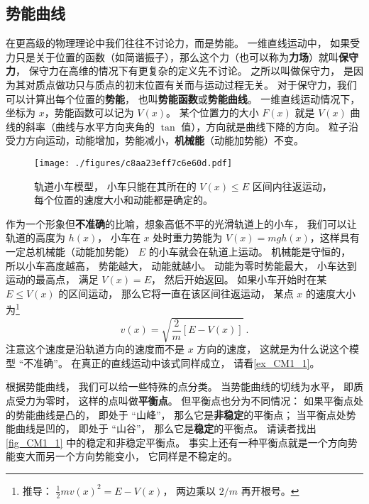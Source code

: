 \subsection{势能曲线}
在更高级的物理理论中我们往往不讨论力，而是势能。 一维直线运动中， 如果受力只是关于位置的函数（如简谐振子），那么这个力（也可以称为\textbf{力场}）就叫\textbf{保守力}， 保守力在高维的情况下有更复杂的定义先不讨论。 之所以叫做保守力， 是因为其对质点做功只与质点的初末位置有关而与运动过程无关。 对于保守力，我们可以计算出每个位置的\textbf{势能}， 也叫\textbf{势能函数}或\textbf{势能曲线}。 一维直线运动情况下，坐标为 $x$，势能函数可以记为 $V(x)$。 某个位置力的大小 $F(x)$ 就是 $V(x)$ 曲线的斜率（曲线与水平方向夹角的 $\tan$ 值），方向就是曲线下降的方向。 粒子沿受力方向运动，动能增加，势能减小，\textbf{机械能}（动能加势能）不变。

\begin{figure}[ht]
\centering
\texttt{[image: ./figures/c8aa23eff7c6e60d.pdf]}
\caption{轨道小车模型， 小车只能在其所在的 $V(x) \leqslant E$ 区间内往返运动， 每个位置的速度大小和动能都是确定的。} \label{fig_CM1_1}
\end{figure}

作为一个形象但\textbf{不准确}的比喻，想象高低不平的光滑轨道上的小车， 我们可以让轨道的高度为 $h(x)$， 小车在 $x$ 处时重力势能为 $V(x) = mgh(x)$，这样具有一定总机械能（动能加势能） $E$ 的小车就会在轨道上运动。 机械能是守恒的， 所以小车高度越高， 势能越大， 动能就越小。 动能为零时势能最大， 小车达到运动的最高点， 满足 $V(x) = E$， 然后开始返回。 如果小车开始时在某 $E \leq V(x)$ 的区间运动， 那么它将一直在该区间往返运动， 某点 $x$ 的速度大小为\footnote{推导： $\frac{1}{2}mv(x)^2 = E - V(x)$， 两边乘以 $2/m$ 再开根号。}
\begin{equation}\label{eq_CM1_1}
v(x) = \sqrt{\frac{2}{m}[E - V(x)]}~.
\end{equation}
注意这个速度是沿轨道方向的速度而不是 $x$ 方向的速度， 这就是为什么说这个模型 “不准确”。 在真正的直线运动中该式同样成立， 请看\autoref{ex_CM1_1}。

根据势能曲线， 我们可以给一些特殊的点分类。 当势能曲线的切线为水平， 即质点受力为零时， 这样的点叫做\textbf{平衡点}。 但平衡点也分为不同情况： 如果平衡点处的势能曲线是凸的， 即处于 “山峰”， 那么它是\textbf{非稳定}的平衡点； 当平衡点处势能曲线是凹的， 即处于 “山谷”， 那么它是\textbf{稳定}的平衡点。 请读者找出\autoref{fig_CM1_1} 中的稳定和非稳定平衡点。 事实上还有一种平衡点就是一个方向势能变大而另一个方向势能变小， 它同样是不稳定的。


